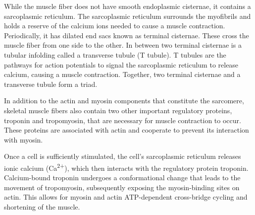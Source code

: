 While the muscle fiber does not have smooth endoplasmic cisternae, it contains a sarcoplasmic reticulum. The sarcoplasmic reticulum surrounds the myofibrils and holds a reserve of the calcium ions needed to cause a muscle contraction. Periodically, it has dilated end sacs known as terminal cisternae. These cross the muscle fiber from one side to the other. In between two terminal cisternae is a tubular infolding called a transverse tubule (T tubule). T tubules are the pathways for action potentials to signal the sarcoplasmic reticulum to release calcium, causing a muscle contraction. Together, two terminal cisternae and a transverse tubule form a triad.

In addition to the actin and myosin components that constitute the sarcomere, skeletal muscle fibers also contain two other important regulatory proteins, troponin and tropomyosin, that are necessary for muscle contraction to occur. These proteins are associated with actin and cooperate to prevent its interaction with myosin.

Once a cell is sufficiently stimulated, the cell's sarcoplasmic reticulum releases ionic calcium (Ca\textsuperscript{2+}), which then interacts with the regulatory protein troponin. Calcium-bound troponin undergoes a conformational change that leads to the movement of tropomyosin, subsequently exposing the myosin-binding sites on actin. This allows for myosin and actin ATP-dependent cross-bridge cycling and shortening of the muscle.



